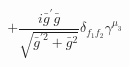 %
\begin{dmath*}
%
  +  \frac{i {\bar g}^\prime {\bar g}{}}{\sqrt{{\bar g}^{\prime 2} + {\bar g}{}^2}}\delta_{f_1 f_2} \gamma^{\mu_3}
%
\end{dmath*}
%
